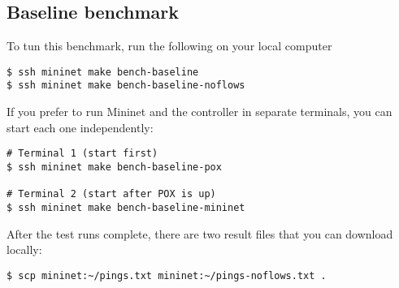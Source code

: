 \subsection{Baseline benchmark}
\label{chapter:appendix.baseline.benchmark}

To tun this benchmark, run the following on your local computer

\begin{Verbatim}
$ ssh mininet make bench-baseline
$ ssh mininet make bench-baseline-noflows
\end{Verbatim}

If you prefer to run Mininet and the controller in separate terminals, you
can start each one independently:

\begin{Verbatim}
# Terminal 1 (start first)
$ ssh mininet make bench-baseline-pox

# Terminal 2 (start after POX is up)
$ ssh mininet make bench-baseline-mininet
\end{Verbatim}

After the test runs complete, there are two result files that you can
download locally:

\begin{Verbatim}
$ scp mininet:~/pings.txt mininet:~/pings-noflows.txt .
\end{Verbatim}

